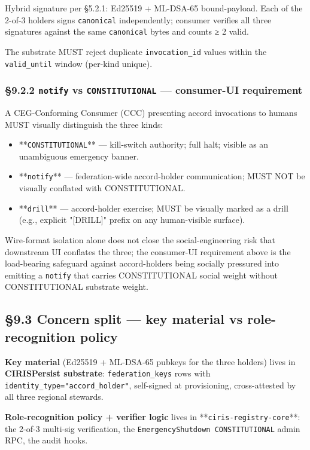 \documentclass[11pt]{article}
\begin{document}
Hybrid signature per §5.2.1: Ed25519 + ML-DSA-65 bound-payload. Each of the 2-of-3 holders signs \texttt{canonical} independently; consumer verifies all three signatures against the same \texttt{canonical} bytes and counts ≥ 2 valid.


The substrate MUST reject duplicate \texttt{invocation\_id} values within the \texttt{valid\_until} window (per-kind unique).


\subsubsection*{§9.2.2 \texttt{notify} vs \texttt{CONSTITUTIONAL} — consumer-UI requirement}


A CEG-Conforming Consumer (CCC) presenting accord invocations to humans MUST visually distinguish the three kinds:


\begin{itemize}\setlength\itemsep{0pt}
\item **\texttt{CONSTITUTIONAL}** — kill-switch authority; full halt; visible as an unambiguous emergency banner.
\item **\texttt{notify}** — federation-wide accord-holder communication; MUST NOT be visually conflated with CONSTITUTIONAL.
\item **\texttt{drill}** — accord-holder exercise; MUST be visually marked as a drill (e.g., explicit "[DRILL]" prefix on any human-visible surface).
\end{itemize}


Wire-format isolation alone does not close the social-engineering risk that downstream UI conflates the three; the consumer-UI requirement above is the load-bearing safeguard against accord-holders being socially pressured into emitting a \texttt{notify} that carries CONSTITUTIONAL social weight without CONSTITUTIONAL substrate weight.


\subsection*{§9.3 Concern split — key material vs role-recognition policy}


\textbf{Key material} (Ed25519 + ML-DSA-65 pubkeys for the three holders) lives in \textbf{CIRISPersist substrate}: \texttt{federation\_keys} rows with \texttt{identity\_type="accord\_holder"}, self-signed at provisioning, cross-attested by all three regional stewards.


\textbf{Role-recognition policy + verifier logic} lives in **\texttt{ciris-registry-core}**: the 2-of-3 multi-sig verification, the \texttt{EmergencyShutdown CONSTITUTIONAL} admin RPC, the audit hooks.
\end{document}
